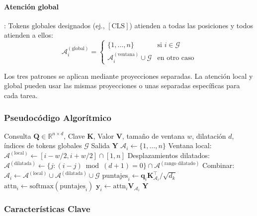 \paragraph{Atención global}: Tokens globales designados (ej., $[\text{CLS}]$) atienden a todas las posiciones y todos atienden a ellos:
\[
\mathcal{A}_i^{(\text{global})} = \begin{cases}
\{1, \ldots, n\} & \text{si } i \in \mathcal{G} \\
\mathcal{A}_i^{(\text{ventana})} \cup \mathcal{G} & \text{en otro caso}
\end{cases}
\]

Los tres patrones se aplican mediante proyecciones separadas. La atención local y global pueden usar las mismas proyecciones o unas separadas específicas para cada tarea.

\subsubsection{Pseudocódigo Algorítmico}

\begin{algorithm}[H]
\caption{Longformer: Ventana Deslizante + Dilatada + Global}
\begin{algorithmic}[1]
\Require Consulta $\mathbf{Q} \in \mathbb{R}^{n \times d}$, Clave $\mathbf{K}$, Valor $\mathbf{V}$, tamaño de ventana $w$, dilatación $d$, índices de tokens globales $\mathcal{G}$
\Ensure Salida $\mathbf{Y}$
        \State $\mathcal{A}_i \gets \{1, \ldots, n\}$ 
    \Else
        \State Ventana local: $\mathcal{A}^{(\text{local})} \gets [i - w/2, i + w/2] \cap [1, n]$
        \State Desplazamientos dilatados: $\mathcal{A}^{(\text{dilatada})} \gets \{j : (i-j) \bmod (d+1) = 0\} \cap \mathcal{A}^{(\text{rango dilatado})}$
        \State Combinar: $\mathcal{A}_i \gets \mathcal{A}^{(\text{local})} \cup \mathcal{A}^{(\text{dilatada})} \cup \mathcal{G}$
    \EndIf
    \State $\text{puntajes}_i \gets \mathbf{q}_i \mathbf{K}_{\mathcal{A}_i}^\top / \sqrt{d_k}$
    \State $\text{attn}_i \gets \text{softmax}(\text{puntajes}_i)$
    \State $\mathbf{y}_i \gets \text{attn}_i \mathbf{V}_{\mathcal{A}_i}$
\EndFor
\Return $\mathbf{Y}$
\end{algorithmic}
\end{algorithm}

\subsubsection{Características Clave}

